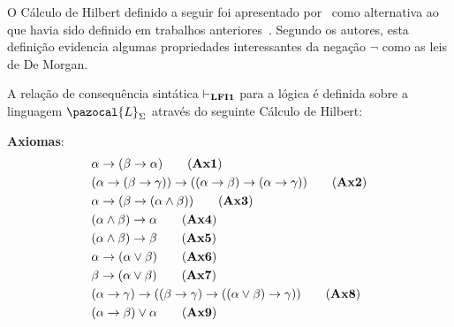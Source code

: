     O Cálculo de Hilbert definido a seguir foi apresentado por~ como alternativa ao que havia sido definido em trabalhos anteriores~\cite{carnielli2000formal,carnielli2007}. Segundo os autores, esta definição evidencia algumas propriedades interessantes da negação $\neg$ como as leis de De Morgan.


    \begin{definicao}[\lfium{}]
        \label{def:lfi1}
        A relação de consequência sintática $\vdash_{\textbf{LFI1}{}}$ para a lógica \lfium{} é definida sobre a linguagem $\pazocal{L}_{\Sigma}$ através do seguinte Cálculo de Hilbert:

        \noindent\textbf{Axiomas}:
        \begin{align*}
            & \alpha \rightarrow (\beta \rightarrow \alpha)\tag{\textbf{Ax1}}                                                                                     \\
            & (\alpha \rightarrow (\beta \rightarrow \gamma)) \rightarrow ((\alpha \rightarrow \beta) \rightarrow (\alpha \rightarrow \gamma ))\tag{\textbf{Ax2}} \\
            & \alpha \rightarrow (\beta \rightarrow (\alpha \land \beta))\tag{\textbf{Ax3}}                                                                       \\
            & (\alpha \land \beta) \rightarrow \alpha\tag{\textbf{Ax4}}                                                                                           \\
            & (\alpha \land \beta) \rightarrow \beta\tag{\textbf{Ax5}}                                                                                            \\
            & \alpha \rightarrow (\alpha \lor \beta)\tag{\textbf{Ax6}}                                                                                            \\
            & \beta \rightarrow (\alpha \lor \beta)\tag{\textbf{Ax7}}                                                                                             \\
            & (\alpha \rightarrow \gamma) \rightarrow ((\beta \rightarrow \gamma) \rightarrow ((\alpha \lor \beta) \rightarrow \gamma))\tag{\textbf{Ax8}}         \\
            & (\alpha \rightarrow \beta) \lor \alpha\tag{\textbf{Ax9}}                                                                                           \\

\end{align*}
\end{definicao}
